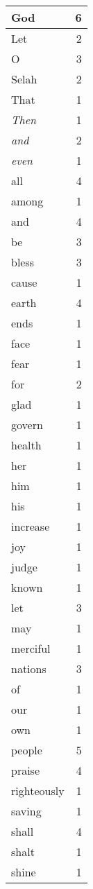 \begin{center}
\begin{longtable}{l|r}
\hline \hline
\endlastfoot
God & 6 \\ \hline
Let & 2 \\ \hline
O & 3 \\ \hline
Selah & 2 \\ \hline
That & 1 \\ \hline
\emph{Then} & 1 \\ \hline
\emph{and} & 2 \\ \hline
\emph{even} & 1 \\ \hline
all & 4 \\ \hline
among & 1 \\ \hline
and & 4 \\ \hline
be & 3 \\ \hline
bless & 3 \\ \hline
cause & 1 \\ \hline
earth & 4 \\ \hline
ends & 1 \\ \hline
face & 1 \\ \hline
fear & 1 \\ \hline
for & 2 \\ \hline
glad & 1 \\ \hline
govern & 1 \\ \hline
health & 1 \\ \hline
her & 1 \\ \hline
him & 1 \\ \hline
his & 1 \\ \hline
increase & 1 \\ \hline
joy & 1 \\ \hline
judge & 1 \\ \hline
known & 1 \\ \hline
let & 3 \\ \hline
may & 1 \\ \hline
merciful & 1 \\ \hline
nations & 3 \\ \hline
of & 1 \\ \hline
our & 1 \\ \hline
own & 1 \\ \hline
people & 5 \\ \hline
praise & 4 \\ \hline
righteously & 1 \\ \hline
saving & 1 \\ \hline
shall & 4 \\ \hline
shalt & 1 \\ \hline
shine & 1 \\ \hline

\end{longtable}
\end{center}
